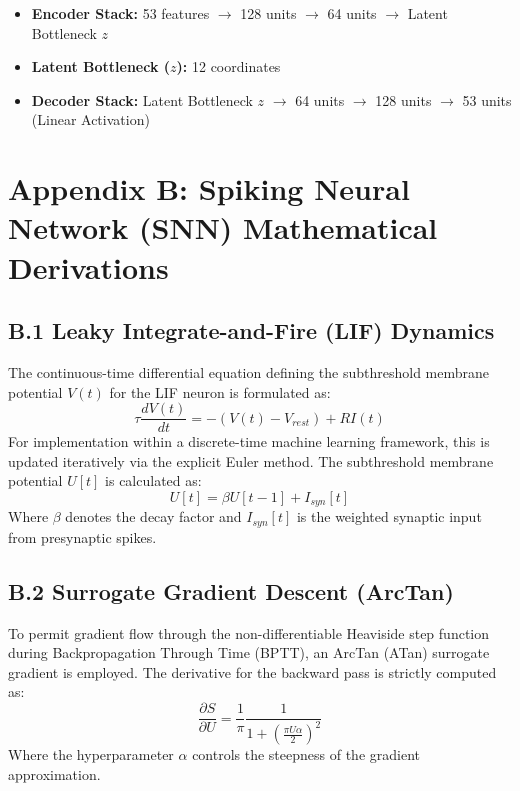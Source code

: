 \documentclass[12pt]{article}
\begin{document}
\begin{itemize}
    \item \textbf{Encoder Stack:} 53 features $\rightarrow$ 128 units $\rightarrow$ 64 units $\rightarrow$ Latent Bottleneck $z$
    \item \textbf{Latent Bottleneck ($z$):} 12 coordinates
    \item \textbf{Decoder Stack:} Latent Bottleneck $z$ $\rightarrow$ 64 units $\rightarrow$ 128 units $\rightarrow$ 53 units (Linear Activation)
\end{itemize}

\vspace{2em}

\section*{Appendix B: Spiking Neural Network (SNN) Mathematical Derivations}

\subsection*{B.1 Leaky Integrate-and-Fire (LIF) Dynamics}
The continuous-time differential equation defining the subthreshold membrane potential $V(t)$ for the LIF neuron is formulated as:
\begin{equation}
    \tau\frac{dV(t)}{dt} = -(V(t) - V_{rest}) + RI(t)
\end{equation}
For implementation within a discrete-time machine learning framework, this is updated iteratively via the explicit Euler method. The subthreshold membrane potential $U[t]$ is calculated as:
\begin{equation}
    U[t] = \beta U[t-1] + I_{syn}[t]
\end{equation}
Where $\beta$ denotes the decay factor and $I_{syn}[t]$ is the weighted synaptic input from presynaptic spikes.

\subsection*{B.2 Surrogate Gradient Descent (ArcTan)}
To permit gradient flow through the non-differentiable Heaviside step function during Backpropagation Through Time (BPTT), an ArcTan (ATan) surrogate gradient is employed. The derivative for the backward pass is strictly computed as:
\begin{equation}
    \frac{\partial S}{\partial U} = \frac{1}{\pi} \frac{1}{1 + \left( \frac{\pi U \alpha}{2} \right)^2}
\end{equation}
Where the hyperparameter $\alpha$ controls the steepness of the gradient approximation.
\end{document}

